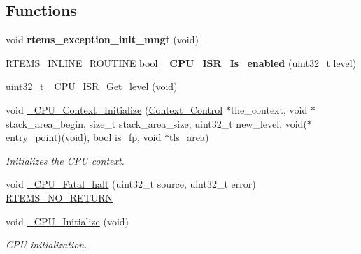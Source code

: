 \subsection*{Functions}
\begin{DoxyCompactItemize}
\item 
\mbox{\label{group__RTEMSScoreCPUi386_ga8e3aa8bcab8ae208cdcabf6b628ea461}} 
void {\bfseries rtems\+\_\+exception\+\_\+init\+\_\+mngt} (void)
\item 
\mbox{\label{group__RTEMSScoreCPUi386_ga5254669b54a06e96ebb585fd50a02c4d}} 
\mbox{\hyperlink{group__RTEMSScoreBaseDefs_gac216239df231d5dbd15e3520b0b9313f}{R\+T\+E\+M\+S\+\_\+\+I\+N\+L\+I\+N\+E\+\_\+\+R\+O\+U\+T\+I\+NE}} bool {\bfseries \+\_\+\+C\+P\+U\+\_\+\+I\+S\+R\+\_\+\+Is\+\_\+enabled} (uint32\+\_\+t level)
\item 
uint32\+\_\+t \mbox{\hyperlink{group__RTEMSScoreCPUi386_ga1d9dcab9170d532b6634a5620385adbd}{\+\_\+\+C\+P\+U\+\_\+\+I\+S\+R\+\_\+\+Get\+\_\+level}} (void)
\item 
void \mbox{\hyperlink{group__RTEMSScoreCPUi386_gaa92701994ad8e3b646667a3e92935ddf}{\+\_\+\+C\+P\+U\+\_\+\+Context\+\_\+\+Initialize}} (\mbox{\hyperlink{structContext__Control}{Context\+\_\+\+Control}} $\ast$the\+\_\+context, void $\ast$stack\+\_\+area\+\_\+begin, size\+\_\+t stack\+\_\+area\+\_\+size, uint32\+\_\+t new\+\_\+level, void($\ast$entry\+\_\+point)(void), bool is\+\_\+fp, void $\ast$tls\+\_\+area)
\begin{DoxyCompactList}\small\item\em Initializes the C\+PU context. \end{DoxyCompactList}\item 
void \mbox{\hyperlink{group__RTEMSScoreCPUi386_ga254ab76f1c02812babdb3d5028f59178}{\+\_\+\+C\+P\+U\+\_\+\+Fatal\+\_\+halt}} (uint32\+\_\+t source, uint32\+\_\+t error) \mbox{\hyperlink{group__RTEMSScoreBaseDefs_gaa2f0ed67aa174f684bb31b7e8bdb386f}{R\+T\+E\+M\+S\+\_\+\+N\+O\+\_\+\+R\+E\+T\+U\+RN}}
\item 
void \mbox{\hyperlink{group__RTEMSScoreCPUi386_ga869484e3d851b032fd826c69ff21fc72}{\+\_\+\+C\+P\+U\+\_\+\+Initialize}} (void)
\begin{DoxyCompactList}\small\item\em C\+PU initialization. \end{DoxyCompactList}\item 
\mbox{\label{group__RTEMSScoreCPUi386_gaa3480454768ad843ce97909111a48a1f}} 

\end{DoxyCompactItemize}
